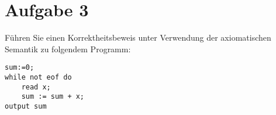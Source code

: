 \documentclass[ngerman,a4paper]{report}
\begin{document}
\section*{Aufgabe 3}
Führen Sie einen Korrektheitsbeweis unter Verwendung der axiomatischen Semantik zu folgendem Programm:\\
\begin{lstlisting}
sum:=0;
while not eof do
	read x;
	sum := sum + x;
output sum
\end{lstlisting}

\end{document}
